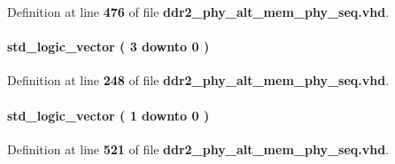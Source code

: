 Definition at line {\bf 476} of file {\bf ddr2\+\_\+phy\+\_\+alt\+\_\+mem\+\_\+phy\+\_\+seq.\+vhd}.

\paragraph[{err\+\_\+code}]{ {\bfseries \textcolor{comment}{std\+\_\+logic\+\_\+vector}\textcolor{vhdlchar}{ }\textcolor{vhdlchar}{(}\textcolor{vhdlchar}{ }\textcolor{vhdlchar}{ } \textcolor{vhdldigit}{3} \textcolor{vhdlchar}{ }\textcolor{keywordflow}{downto}\textcolor{vhdlchar}{ }\textcolor{vhdlchar}{ } \textcolor{vhdldigit}{0} \textcolor{vhdlchar}{ }\textcolor{vhdlchar}{)}\textcolor{vhdlchar}{ }} \hspace{0.3cm}{\ttfamily [Record]}}\label{classddr2__phy__alt__mem__phy__record__pkg_a87a0ce29c49e10fbf124ed109ac24ef3}


Definition at line {\bf 248} of file {\bf ddr2\+\_\+phy\+\_\+alt\+\_\+mem\+\_\+phy\+\_\+seq.\+vhd}.

\paragraph[{err\+\_\+code}]{ {\bfseries \textcolor{comment}{std\+\_\+logic\+\_\+vector}\textcolor{vhdlchar}{ }\textcolor{vhdlchar}{(}\textcolor{vhdlchar}{ }\textcolor{vhdlchar}{ } \textcolor{vhdldigit}{1} \textcolor{vhdlchar}{ }\textcolor{keywordflow}{downto}\textcolor{vhdlchar}{ }\textcolor{vhdlchar}{ } \textcolor{vhdldigit}{0} \textcolor{vhdlchar}{ }\textcolor{vhdlchar}{)}\textcolor{vhdlchar}{ }} \hspace{0.3cm}{\ttfamily [Record]}}\label{classddr2__phy__alt__mem__phy__record__pkg_a89147d562e118fa47dc0e25d98c5c0cb}


Definition at line {\bf 521} of file {\bf ddr2\+\_\+phy\+\_\+alt\+\_\+mem\+\_\+phy\+\_\+seq.\+vhd}.


